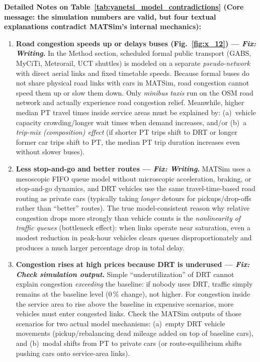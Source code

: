 \documentclass[preprint,12pt,authoryear]{elsarticle}
\begin{document}
\begingroup
\footnotesize
\setlength{\parskip}{2pt}
\noindent\textbf{Detailed Notes on Table~\ref{tab:yanetsi_model_contradictions} (Core message: the simulation numbers are valid, but four textual explanations contradict MATSim's internal mechanics):}
\begin{enumerate}\setlength{\itemsep}{2pt}\setlength{\parskip}{0pt}\setlength{\parsep}{0pt}
  \item \textbf{Road congestion speeds up or delays buses (Fig.~\ref{fig:x_12}) --- \textit{Fix: Writing}.}
    In the Method section, scheduled formal public transport (GABS, MyCiTi, Metrorail, UCT shuttles) is modeled on a separate \emph{pseudo-network} with direct aerial links and fixed timetable speeds.
    Because formal buses do not share physical road links with cars in MATSim, road congestion cannot speed them up or slow them down.
    Only \emph{minibus taxis} run on the OSM road network and actually experience road congestion relief.
    Meanwhile, higher median PT travel times inside service areas must be explained by: (a)~vehicle capacity crowding/longer wait times when demand increases, and/or (b)~a \emph{trip-mix (composition) effect} (if shorter PT trips shift to DRT or longer former car trips shift to PT, the median PT trip duration increases even without slower buses).
  \item \textbf{Less stop-and-go and better routes --- \textit{Fix: Writing}.}
    MATSim uses a mesoscopic FIFO queue model without microscopic acceleration, braking, or stop-and-go dynamics, and DRT vehicles use the same travel-time-based road routing as private cars (typically taking \emph{longer} detours for pickups/drop-offs rather than ``better'' routes).
    The true model-consistent reason why relative congestion drops more strongly than vehicle counts is the \emph{nonlinearity of traffic queues} (bottleneck effect): when links operate near saturation, even a modest reduction in peak-hour vehicles clears queues disproportionately and produces a much larger percentage drop in total delay.
  \item \textbf{Congestion rises at high prices because DRT is underused --- \textit{Fix: Check simulation output}.}
    Simple ``underutilization'' of DRT cannot explain congestion \emph{exceeding} the baseline: if nobody uses DRT, traffic simply remains at the baseline level (0\,\% change), not higher.
    For congestion inside the service area to rise above the baseline in expensive scenarios, more vehicles must enter congested links.
    Check the MATSim outputs of those scenarios for two actual model mechanisms: (a)~empty DRT vehicle movements (pickup/rebalancing dead mileage added on top of baseline cars), and (b)~modal shifts from PT to private cars (or route-equilibrium shifts pushing cars onto service-area links).

\end{enumerate}
\end{document}
